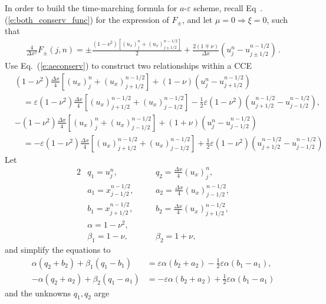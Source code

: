 \documentclass[11pt,dvips]{article}
\numberwithin{equation}{section}
\begin{document}
In order to build the time-marching formula for $a$-$\varepsilon$ scheme,
recall Eq~.(\ref{e:both_conserv_func}) for the expression of
$F_{\pm}$, and let $\mu=0\Rightarrow\xi=0$, such that
\begin{align*}
  \frac{4}{\Delta x^2}F_{\pm}(j,n)
    = \pm\frac{(1-\nu^2)[(u_x)_j^n+(u_x)_{j\pm1/2}^{n-1/2}]}{2}
    + \frac{2(1\mp\nu)}{\Delta x}(u_j^n-u_{j\pm1/2}^{n-1/2})\,.
\end{align*}
Use Eq.~(\ref{e:aeconserv}) to construct two relationships within a CCE
\begin{align*}
  &(1-\nu^2)\frac{\Delta x}{4}[(u_x)_j^n+(u_x)_{j+1/2}^{n-1/2}]
    + (1-\nu)(u_j^n-u_{j+1/2}^{n-1/2}) \\
  &\quad = \varepsilon(1-\nu^2)\frac{\Delta x}{4}
           [(u_x)_{j+1/2}^{n-1/2}+(u_x)_{j-1/2}^{n-1/2}]
         - \frac{1}{2}
           \varepsilon(1-\nu^2)(u_{j+1/2}^{n-1/2}-u_{j-1/2}^{n-1/2}), \\
  &-(1-\nu^2)\frac{\Delta x}{4}[(u_x)_j^n+(u_x)_{j-1/2}^{n-1/2}]
    + (1+\nu)(u_j^n-u_{j-1/2}^{n-1/2}) \\
  &\quad = -\varepsilon(1-\nu^2)\frac{\Delta x}{4}
            [(u_x)_{j+1/2}^{n-1/2}+(u_x)_{j-1/2}^{n-1/2}]
          + \frac{1}{2}
            \varepsilon(1-\nu^2)(u_{j+1/2}^{n-1/2}-u_{j-1/2}^{n-1/2})
\end{align*}
Let
\begin{alignat*}{2}
  &       q_1 = u_j^n,
  &\quad& q_2 = \frac{\Delta x}{4}(u_x)_j^n, \\
  &       a_1 = x_{j-1/2}^{n-1/2},
  &&      a_2 = \frac{\Delta x}{4}(u_x)_{j-1/2}^{n-1/2}, \\
  &       b_1 = x_{j+1/2}^{n-1/2},
  &&      b_2 = \frac{\Delta x}{4}(u_x)_{j+1/2}^{n-1/2}, \\
  &       \alpha = 1-\nu^2, && \\
  &       \beta_1 = 1-\nu,
  &&      \beta_2 = 1+\nu,
\end{alignat*}
and simplify the equations to
\begin{align*}
  \alpha(q_2+b_2) + \beta_1(q_1-b_1)
    &=   \varepsilon\alpha(b_2+a_2)
       - \frac{1}{2}\varepsilon\alpha(b_1-a_1), \\
  -\alpha(q_2+a_2) + \beta_2(q_1-a_1)
    &=  -\varepsilon\alpha(b_2+a_2)
       + \frac{1}{2}\varepsilon\alpha(b_1-a_1)
\end{align*}
and the unknowns $q_1, q_2$ arge
\end{document}
